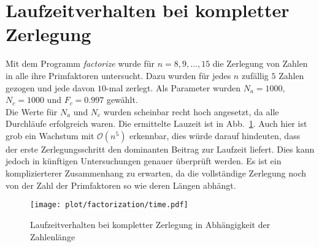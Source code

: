 \section{Laufzeitverhalten bei kompletter Zerlegung}
Mit dem Programm \textit{factorize} wurde für $n=8,9,\dots,15$ die Zerlegung von Zahlen in alle ihre Primfaktoren untersucht. Dazu wurden für jedes $n$ zufällig $5$ Zahlen gezogen und jede davon $10$-mal zerlegt. Als Parameter wurden $N_a=1000$, $N_c=1000$ und $F_c=0.997$ gewählt. \\
Die Werte für $N_a$ und $N_c$ wurden scheinbar recht hoch angesetzt, da alle Durchläufe erfolgreich waren. Die ermittelte Lauzeit ist in Abb.~\ref{fig:runtime-factorization}. Auch hier ist grob ein Wachstum mit $\mathcal{O}\left(n^5\right)$ erkennbar, dies würde darauf hindeuten, dass der erste Zerlegungsschritt den dominanten Beitrag zur Laufzeit liefert. Dies kann jedoch in künftigen Untersuchungen genauer überprüft werden. Es ist ein komplizierterer Zusammenhang zu erwarten, da die vollständige Zerlegung noch von der Zahl der Primfaktoren so wie deren Längen abhängt.

\begin{figure}[!ht]
		\centering
		\texttt{[image: plot/factorization/time.pdf]}
		\caption{Laufzeitverhalten bei kompletter Zerlegung in Abhängigkeit der Zahlenlänge}\label{fig:runtime-factorization}
\end{figure}

